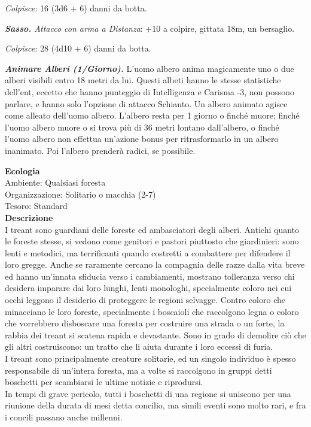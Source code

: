 \begin{multicols}{2}
\emph{Colpisce:} 16 (3d6 + 6) danni da botta.

\emph{\textbf{Sasso.} Attacco con arma a Distanza}: +10 a colpire, gittata 18m, un bersaglio.

\emph{Colpisce:} 28 (4d10 + 6) danni da botta.

\emph{\textbf{Animare Alberi (1/Giorno).}} L'uomo albero anima magicamente uno o due alberi visibili entro 18 metri da lui. Questi albeti hanno le stesse statistiche dell'ent, eccetto che hanno punteggio di Intelligenza e Carisma -3, non possono parlare, e hanno solo l'opzione di attacco Schianto. Un albero animato agisce come alleato dell'uomo albero. L'albero resta per 1 giorno o finché muore; finché l'uomo albero muore o si trova più di 36 metri lontano dall'albero, o finché l'uomo albero non effettua un'azione bonus per ritrasformarlo in un albero inanimato. Poi l'albero prenderà radici, se possibile.

\textbf{Ecologia}\\
Ambiente: Qualsiasi foresta\\
Organizzazione: Solitario o macchia (2-7)\\
Tesoro: Standard\\
\textbf{Descrizione}\\
I treant sono guardiani delle foreste ed ambasciatori degli alberi. Antichi quanto le foreste stesse, si vedono come genitori e pastori piuttosto che giardinieri: sono lenti e metodici, ma terrificanti quando costretti a combattere per difendere il loro gregge. Anche se raramente cercano la compagnia delle razze dalla vita breve ed hanno un'innata sfiducia verso i cambiamenti, mostrano tolleranza verso chi desidera imparare dai loro lunghi, lenti monologhi, specialmente coloro nei cui occhi leggono il desiderio di proteggere le regioni selvagge. Contro coloro che minacciano le loro foreste, specialmente i boscaioli che raccolgono legna o coloro che vorrebbero disboscare una foresta per costruire una strada o un forte, la rabbia dei treant si scatena rapida e devastante. Sono in grado di demolire ciò che gli altri costruiscono: un tratto che li aiuta durante i loro eccessi di furia.\\

I treant sono principalmente creature solitarie, ed un singolo individuo è spesso responsabile di un'intera foresta, ma a volte si raccolgono in gruppi detti boschetti per scambiarsi le ultime notizie e riprodursi.\\

In tempi di grave pericolo, tutti i boschetti di una regione si uniscono per una riunione della durata di mesi detta concilio, ma simili eventi sono molto rari, e fra i concili passano anche millenni.\\


\end{multicols}

